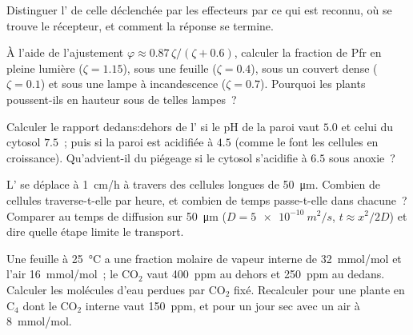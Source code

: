 \begin{exercise}[$\star$]\label{exo:b3:plant-molecular-physiology:4}
Distinguer l' de celle déclenchée par
les effecteurs par ce qui est reconnu, où se trouve le récepteur, et
comment la réponse se termine.
\end{exercise}

\begin{exercise}[$\star\star$]\label{exo:b3:plant-molecular-physiology:5}
À l'aide de l'ajustement $\varphi \approx 0.87\,\zeta/(\zeta + 0.6)$,
calculer la fraction de Pfr en pleine lumière ($\zeta = 1.15$), sous une
feuille ($\zeta =
0.4$), sous un couvert dense ($\zeta = 0.1$) et sous une lampe à
incandescence ($\zeta = 0.7$). Pourquoi les plants poussent-ils en
hauteur sous de telles lampes~?
\end{exercise}

\begin{exercise}[$\star\star$]\label{exo:b3:plant-molecular-physiology:6}
Calculer le rapport dedans:dehors de l' si le pH de la paroi vaut
$5.0$ et celui du cytosol $7.5$~; puis si la paroi est acidifiée à $4.5$
(comme le font les cellules en croissance). Qu'advient-il du piégeage si
le cytosol s'acidifie à $6.5$ sous anoxie~?
\end{exercise}

\begin{exercise}[$\star\star$]\label{exo:b3:plant-molecular-physiology:7}
L' se déplace à \qty{1}{cm/h} à travers des cellules longues de
\qty{50}{\micro m}. Combien de cellules traverse-t-elle par heure, et
combien de temps passe-t-elle dans chacune~? Comparer au temps de
diffusion sur \qty{50}{\micro m} ($D =
\qty{5e-10}{m^2/s}$, $t \approx x^{2}/2D$) et dire quelle étape limite
le transport.
\end{exercise}

\begin{exercise}[$\star\star$]\label{exo:b3:plant-molecular-physiology:8}
Une feuille à \qty{25}{\celsius} a une fraction molaire de vapeur
interne de \qty{32}{mmol/mol} et l'air \qty{16}{mmol/mol}~; le CO$_{2}$
vaut \qty{400}{ppm} au dehors et \qty{250}{ppm} au dedans. Calculer les
molécules d'eau perdues par CO$_{2}$ fixé. Recalculer pour une plante en
C$_{4}$ dont le CO$_{2}$ interne vaut \qty{150}{ppm}, et pour un jour sec
avec un air à \qty{8}{mmol/mol}.
\end{exercise}

